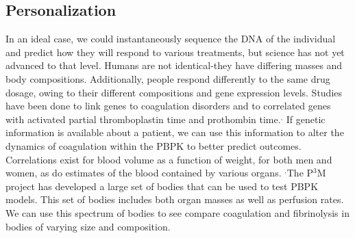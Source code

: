 \documentclass[12pt]{article}
\newcommand{\beginsupplement}{%
        \setcounter{table}{0}
        \renewcommand{\thetable}{S\arabic{table}}%
        \setcounter{figure}{0}
        \renewcommand{\thefigure}{S\arabic{figure}}%
     }
\begin{document}
\subsection*{Personalization}
In an ideal case, we could instantaneously sequence the DNA of the individual and predict how they will respond to various treatments, but science has not yet advanced to that level. Humans are not identical-they have differing masses and body compositions. Additionally, people respond differently to the same drug dosage, owing to their different compositions and gene expression levels.  
Studies have been done to link genes to coagulation disorders  and to correlated genes with activated partial thromboplastin time and prothombin time.\cite{soria2009genetic}$^,$\cite{tang2012genetic} If genetic information is available about a patient, we can use this information to alter the dynamics of coagulation within the PBPK to better predict outcomes.
Correlations exist for blood volume as a function of weight, for both men and women, as do estimates of the blood contained by various organs. \cite{feldschuh1977prediction}$^,$\cite{leggett1991suggested}The P$^3$M project has developed a large set of bodies that can be used to test PBPK models. \cite{price2003modeling} This set of bodies includes both organ masses as well as perfusion rates. We can use this spectrum of bodies to see compare coagulation and fibrinolysis in bodies of varying size and composition. 
\newpage


\pagebreak
\beginsupplement
\end{document}
